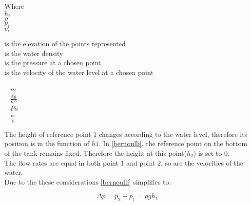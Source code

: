 \begin{minipage}[t]{0.20\textwidth}
Where\\
\hspace*{8mm} $h_i$ \\
\hspace*{8mm} $\rho$ \\
\hspace*{8mm} $p_i$ \\
\hspace*{8mm} $v_i$ \\

\end{minipage}
\begin{minipage}[t]{0.68\textwidth}
\vspace*{2mm}
is the elevation of the points represented\\
is the water density\\
is the pressure at a chosen point\\
is the velocity of the water level at a chosen point
\end{minipage}
\begin{minipage}[t]{0.10\textwidth}
\vspace*{2mm}
\textcolor{White}{te}$\unit{m}$\\
\textcolor{White}{te}$\unit{\frac{kg}{m^3}}$\\
\textcolor{White}{te}$\unit{Pa}$\\
\textcolor{White}{te}$\unit{\frac{m}{s}}$
\end{minipage}


The height of reference point $1$ changes according to the water level, therefore its position is in the function of $h1$. 
In \eqref{bernoulli}, the reference point on the bottom of the tank remains fixed.
Therefore the height at this point($h_2$) is set to 0. 
\\
The flow rates are equal in both point $1$ 
and point $2$, so are the velocities of the water. \\
Due to the these considerations \eqref{bernoulli} simplifies to: 

\begin{equation}
  \Delta p = p_2 - p_1 = \rho g h_1
  \label{Pressuredifference}
\end{equation}

